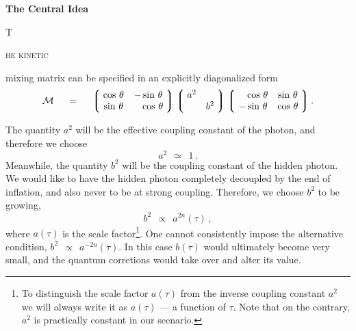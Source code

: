 \documentclass[12pt]{article}
\def\beq{\begin{equation}}
\def\eeq{\end{equation}}
\newcommand{\mc}[1]{\mathcal{#1}}
\newcommand{\ph}{\phantom}
\newcommand{\lgr}{\left\lgroup}
\newcommand{\rgr}{\right\rgroup}
\begin{document}
\centerline{\Huge\bf The Central Idea}

\vspace{2.0mm}

\begin{minipage}[b]{0.76cm}
                \fontsize{44}{12}
                \selectfont
                T
\end{minipage}
\begin{minipage}[b]{3.36cm}
        	\Large{}\selectfont
		\textsc{he kinetic}
\end{minipage}
	mixing matrix can be specified in an explicitly diagonalized form
\beq
\label{M}
	\mc{M}  ~~~~=~~~~  
			\lgr\; \begin{matrix}
				\cos\, \theta    &    - \sin\, \theta \\
				\sin\, \theta    &    \ph- \cos\, \theta
			\end{matrix} \;\rgr
			\lgr\; \begin{matrix}
			     		a^2    &        \\
					       &    b^2
			\end{matrix} \;\rgr
			\lgr\; \begin{matrix}
				\ph-\cos\, \theta    &    \sin\, \theta \\
				- \sin\, \theta    &    \cos\, \theta
			\end{matrix} \;\rgr
			.
\eeq

	The quantity $ a^2 $ will be the effective coupling constant of the photon, and therefore
	we choose 
\[
	a^2  ~~\simeq~~  1\,.
\]
	Meanwhile, the quantity $ b^2 $ will be the coupling constant of the hidden photon.
	We would like to have the hidden photon completely decoupled by the end of inflation, and also
	never to be at strong coupling.
	Therefore, we choose $ b^2 $ to be growing,
\[
	b^2  ~~\propto~~ a^{2n}(\tau)\,,
\]
	where $ a(\tau) $ is the scale factor\footnote{
	To distinguish the scale factor $ a(\tau) $ from the inverse coupling constant $ a^2 $ 
	we will always write it as $ a(\tau) $ --- a function of $ \tau $.
	Note that on the contrary, $ a^2 $ is practically constant in our scenario.}.
	One cannot consistently impose the alternative condition, 
$ b^2 ~~\propto~~ a^{-2n}(\tau) $.
	In this case $ b(\tau) $ would ultimately become very small, 
	and the quantum corretions would take over and alter its value.
\end{document}
